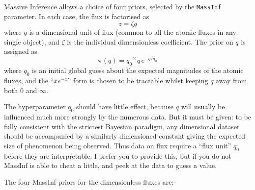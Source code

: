 \bigskip
{}
\smallskip

Massive Inference allows a choice of four priors, selected by the {\tt MassInf} parameter.
In each case, the flux is factorised as
$$
    z = \zeta q
$$
where $q$ is a dimensional unit of flux (common to all the atomic fluxes in any single object), and $\zeta$ is the individual dimensionless coefficient.
The prior on $q$ is assigned as
$$
    \pi(q) = q_0^{-2}\,q\,e^{-q/q_0}
$$
where $q_0$ is an initial global guess about the expected magnitudes of the atomic fluxes,
and the ``$xe^{-x}$'' form is chosen to be tractable whilst keeping $q$ away from both 0 and $\infty$.

The hyperparameter $q_0$ should have little effect, because $q$ will usually be influenced much more strongly by the numerous data.
But it must be given: to be fully consistent with the strictest Bayesian paradigm, 
any dimensional dataset should be accompanied by a similarly dimensioned constant giving the expected size of phenomenon being observed.
Thus data on flux require a ``flux unit'' $q_0$ before they are interpretable.
I prefer you to provide this, but if you do not MassInf is able to cheat a little, and peek at the data to guess a value.

The four MassInf priors for the dimensionless fluxes are:-

